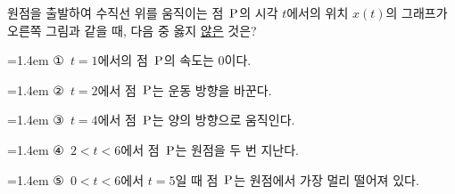 \noindent\begin{minipage}[t]{0.58\linewidth}\vspace{0pt}\raggedright 원점을 출발하여 수직선 위를 움직이는 점~$\mathrm{P}$의 시각 $t$에서의 위치 $x(t)$의 그래프가 오른쪽 그림과 같을 때, 다음 중 옳지 \underline{않은} 것은?\end{minipage}\hfill\begin{minipage}[t]{0.4\linewidth}\vspace{0pt}\centering \resizebox{\ifdim\width>\linewidth\linewidth\else\width\fi}{!}{}\end{minipage}\par
\par\medskip\par\noindent\hangindent=1.4em {\small ①}\ $t=1$에서의 점~$\mathrm{P}$의 속도는 $0$이다.\par\noindent\hangindent=1.4em {\small ②}\ $t=2$에서 점~$\mathrm{P}$는 운동 방향을 바꾼다.\par\noindent\hangindent=1.4em {\small ③}\ $t=4$에서 점~$\mathrm{P}$는 양의 방향으로 움직인다.\par\noindent\hangindent=1.4em {\small ④}\ $2<t<6$에서 점~$\mathrm{P}$는 원점을 두 번 지난다.\par\noindent\hangindent=1.4em {\small ⑤}\ $0<t<6$에서 $t=5$일 때 점~$\mathrm{P}$는 원점에서 가장 멀리 떨어져 있다.\par\medskip
